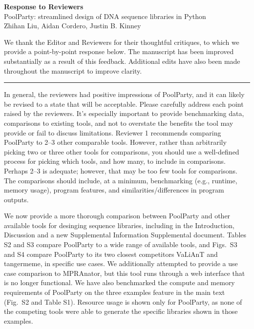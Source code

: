 \documentclass[11pt]{article}
\newenvironment{response}{\par\color{responseblue}}{\par}
\newcommand{\reviewersection}[1]{%
  \bigskip\par\noindent{\large\bfseries #1}\par\medskip\hrule\medskip}
\begin{document}
\begin{center}
{\Large\bfseries Response to Reviewers}\\[0.6em]
{\large PoolParty: streamlined design of DNA sequence libraries in Python}\\[0.8em]
Zhihan Liu, Aidan Cordero, Justin B. Kinney\\[0.7em]
\end{center}

\begin{response}
We thank the Editor and Reviewers for their thoughtful critiques, to which we provide a point-by-point response below. The manuscript has been improved substantially as a result of this feedback. Additional edits have also been made throughout the manuscript to improve clarity. 
\end{response}

\reviewersection{Editor Comments}

In general, the reviewers had positive impressions of PoolParty, and it can
likely be revised to a state that will be acceptable. Please carefully address
each point raised by the reviewers. It's especially important to provide
benchmarking data, comparisons to existing tools, and not to overstate the
benefits the tool may provide or fail to discuss limitations. Reviewer 1
recommends comparing PoolParty to 2--3 other comparable tools. However, rather
than arbitrarily picking two or three other tools for comparisons, you should
use a well-defined process for picking which tools, and how many, to include in
comparisons. Perhaps 2--3 is adequate; however, that may be too few tools for
comparisons. The comparisons should include, at a minimum, benchmarking (e.g.,
runtime, memory usage), program features, and similarities/differences in
program outputs.

\begin{response}
We now provide a more thorough comparison between PoolParty and other available tools for desinging sequence libraries, including in the Introduction, Discussion and a new Supplemental Information Supplemental document. Tables S2 and S3 compare PoolParty to a wide range of available tools, and Figs.~S3 and S4 compare PoolParty to its two closest competitors VaLiAnT and tangermeme, in specific use cases. We additionally attempted to provide a use case comparison to MPRAnator, but this tool runs through a web interface that is no longer functional. We have also benchmarked the compute and memory requirements of PoolParty on the three examples feature in the main text (Fig.~S2 and Table S1). Resource usage is shown only for PoolParty, as none of the competing tools were able to generate the specific libraries shown in those examples. 
\end{response}
\end{document}
